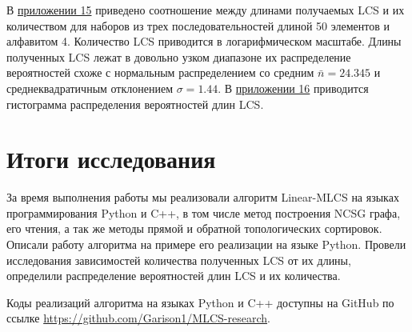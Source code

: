 \documentclass[a4paper,12pt]{extarticle}
\begin{document}
В \hyperref[diog:2]{приложении 15} приведено соотношение между длинами получаемых LCS и их количеством для наборов из трех последовательностей длиной 50 элементов и алфавитом 4. Количество LCS приводится в логарифмическом масштабе. Длины полученных LCS лежат в довольно узком диапазоне их распределение вероятностей схоже с нормальным распределением со средним $\bar{n} = 24.345$ и среднеквадратичным отклонением $\sigma = 1.44$. В \hyperref[diog:3]{приложении 16} приводится гистограмма распределения вероятностей длин LCS.

\section{Итоги исследования}

За время выполнения работы мы реализовали алгоритм Linear-MLCS на языках программирования Python и C++, в том числе метод построения NCSG графа, его чтения, а так же методы прямой и обратной топологических сортировок. Описали работу алгоритма на примере его реализации на языке Python. Провели исследования зависимостей количества полученных LCS от их длины, определили распределение вероятностей длин LCS и их количества.

Коды реализаций алгоритма на языках Python и C++ доступны на GitHub по ссылке \href{https://github.com/Garison1/MLCS-research}{https://github.com/Garison1/MLCS-research}.
\nocite{*}
\end{document}
